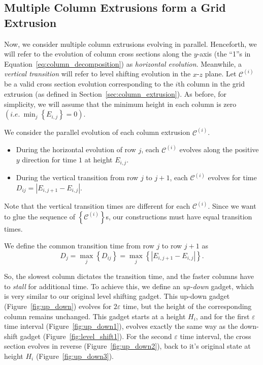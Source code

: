 \subsection{Multiple Column Extrusions form a Grid Extrusion}
\label{sec:grid_extrusion}

Now, we consider multiple column extrusions evolving in parallel.
Henceforth, we will refer to the evolution of column cross sections along the $y$-axis
(the ``1''s in Equation~\ref{eq:column_decomposition}) as \emph{horizontal evolution}.
Meanwhile, a \emph{vertical transition} will refer to level shifting evolution in the $x$-$z$ plane.
Let $\mathcal C^{(i)}$ be a valid cross section evolution corresponding
to the $i$th column in the grid extrusion (as defined in Section~\ref{sec:column_extrusion}).
As before, for simplicity, we will assume that the minimum height in each column is zero $\left( i.e.\ \min_j\left\{ E_{i,j}\right\} = 0 \right)$.

%

We consider the parallel evolution of each column extrusion $\mathcal C^{(i)}$.
\begin{itemize}
    \item During the horizontal evolution of row $j$, each $\mathcal C^{(i)}$ evolves along the positive $y$ direction for time $1$ at height $E_{i,j}$.
    \item During the vertical transition from row $j$ to $j+1$, each $\mathcal C^{(i)}$ evolves for time $ D_{ij} = \left| E_{i,j+1}-E_{i,j}\right|$.
\end{itemize}
Note that the vertical transition times are different for each $\mathcal C^{(i)}$.
Since we want to glue the sequence of $\left\{ \mathcal C^{(i)}\right\}$s, our constructions must have equal transition times.

\begin{definition}
\label{def:slowest_column}
We define the common transition time from row $j$ to row $j+1$ as
$$D_j = \max_j\left\{ D_{ij}\right\} = \max_j\left\{ \left| E_{i,j+1}-E_{i,j}\right|\right\}.$$
\end{definition}

So, the slowest column dictates the transition time, and the faster columns have to \emph{stall} for additional time.
To achieve this, we define an \emph{up-down} gadget, which is very similar to our original level shifting gadget.
This up-down gadget (Figure~\ref{fig:up_down}) evolves for $2\varepsilon$ time, but the height of the corresponding column remains unchanged.
This gadget starts at a height $H_i$, and for the first $\varepsilon$ time interval (Figure~\ref{fig:up_down1}),
evolves exactly the same way as the down-shift gadget (Figure~\ref{fig:level_shift1}).
For the second $\varepsilon$ time interval, the cross section evolves in reverse (Figure~\ref{fig:up_down2}),
back to it's original state at height $H_i$ (Figure~\ref{fig:up_down3}).

